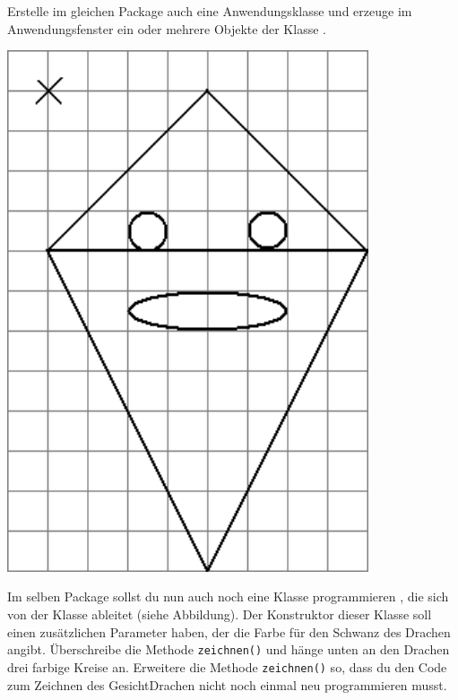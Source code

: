 \begin{compactenum}[a)]
\begin{minipage}{0.6\textwidth}
Erstelle im gleichen Package auch eine Anwendungsklasse und erzeuge im
Anwendungsfenster ein oder mehrere Objekte der Klasse .
\end{minipage}
\hfill
\begin{minipage}{0.3\textwidth}
\includegraphics[width=0.8\textwidth]{./inf/SEKII/16_Java_Vererbung/Aufgabe4b.png}
\end{minipage}

\begin{minipage}{0.6\textwidth}
\item Im selben Package sollst du nun auch noch eine Klasse
 programmieren , die sich von der Klasse
 ableitet (siehe Abbildung). Der Konstruktor dieser
Klasse soll einen zusätzlichen Parameter haben, der die Farbe für den
Schwanz des Drachen angibt. Überschreibe die Methode \verb|zeichnen()| und
hänge unten an den Drachen drei farbige Kreise an. Erweitere die Methode
\verb|zeichnen()| so, dass du den Code zum Zeichnen des GesichtDrachen nicht
noch einmal neu programmieren musst.


\end{minipage}
\end{compactenum}
